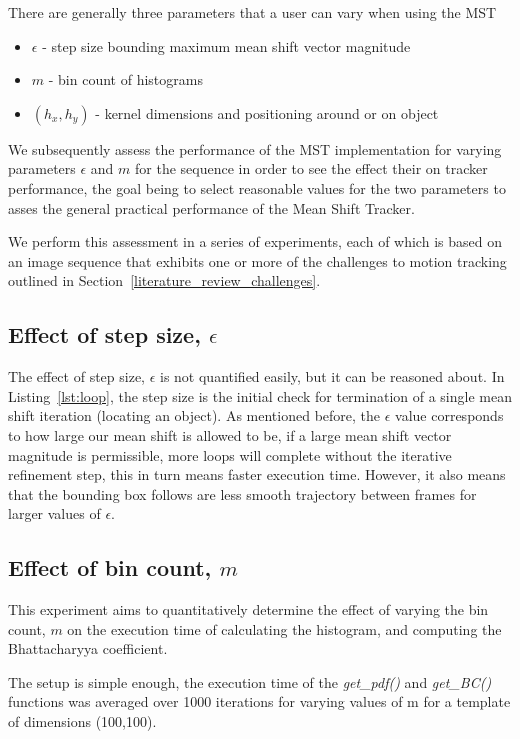 There are generally three parameters that a user can vary when using the MST
\begin{itemize}
    \item $\epsilon$ - step size bounding maximum mean shift vector magnitude
    \item $m$ - bin count of histograms
    \item $(h_x,h_y)$ - kernel dimensions and positioning around or on object
\end{itemize}
We subsequently assess the performance of the MST implementation
for varying parameters $\epsilon$ and $m$ for the sequence in order to see the
effect their on tracker performance, the goal being to select reasonable values
for the two parameters to asses the general practical performance of the Mean
Shift Tracker. 

We perform this assessment in a series of experiments, each of which is based on an image
sequence that exhibits one or more of the challenges to motion tracking outlined
in Section~\ref{literature_review_challenges}. 
 
\subsection{Effect of step size, $\epsilon$}\label{results_eps}
The effect of step size, $\epsilon$ is not quantified easily, but it can be reasoned
about. In Listing~\ref{lst:loop}, the step size is the initial check for
termination of a single mean shift iteration (locating an object). As mentioned
before, the $\epsilon$ value corresponds to how large our mean shift is allowed
to be, if a large mean shift vector magnitude is permissible, more loops will
complete without the iterative refinement step, this in turn means faster execution time.
However, it also means that the bounding box follows are less smooth
trajectory between frames for larger values of $\epsilon$.


\subsection{Effect of bin count, $m$}\label{results_m}
This experiment aims to quantitatively determine the effect of varying the
bin count, $m$ on the execution time of calculating the histogram, and computing
the Bhattacharyya coefficient.

The setup is simple enough, the execution time of the \textit{get\_pdf()} and
\textit{get\_BC()} functions was averaged over 1000 iterations for varying
values of m for a template of dimensions (100,100).

